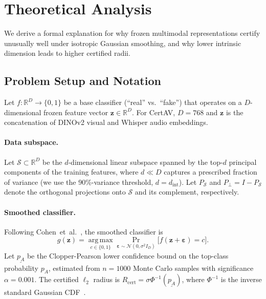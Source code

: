 
\section{Theoretical Analysis}
\label{sec:theory}

We derive a formal explanation for why frozen multimodal
representations certify unusually well under isotropic Gaussian
smoothing, and why lower intrinsic dimension leads to higher
certified radii.

\subsection{Problem Setup and Notation}
\label{sec:theory:setup}

Let $f : \mathbb{R}^D \to \{0,1\}$ be a base classifier
(``real'' vs.\ ``fake'') that operates on a $D$-dimensional frozen
feature vector $\mathbf{z} \in \mathbb{R}^D$.
For CertAV, $D=768$ and $\mathbf{z}$ is the concatenation of
DINOv2 visual and Whisper audio embeddings.

\paragraph*{Data subspace.}
Let $\mathcal{S} \subset \mathbb{R}^D$ be the $d$-dimensional linear
subspace spanned by the top-$d$ principal components of the training
features, where $d \ll D$ captures a prescribed fraction of variance
(we use the 90\%-variance threshold, $d = d_\text{int}$).
Let $P_\mathcal{S}$ and $P_{\perp} = I - P_\mathcal{S}$ denote the
orthogonal projections onto $\mathcal{S}$ and its complement,
respectively.

\paragraph*{Smoothed classifier.}
Following Cohen~et~al.~\cite{cohen2019certified}, the smoothed
classifier is
\begin{equation}
  g(\mathbf{z})
    = \operatorname*{arg\,max}_{c \in \{0,1\}}
      \Pr_{\boldsymbol{\varepsilon} \sim \mathcal{N}(0,\sigma^2 I_D)}
      \!\bigl[f(\mathbf{z}+\boldsymbol{\varepsilon})=c\bigr].
  \label{eq:smoothed}
\end{equation}
Let $\underline{p_A}$ be the Clopper-Pearson lower confidence bound
on the top-class probability $p_A$, estimated from $n=1000$ Monte
Carlo samples with significance $\alpha=0.001$.
The certified $\ell_2$ radius is $R_\text{cert} = \sigma\Phi^{-1}(\underline{p_A})$,
where $\Phi^{-1}$ is the inverse standard Gaussian CDF~\cite{cohen2019certified}.

